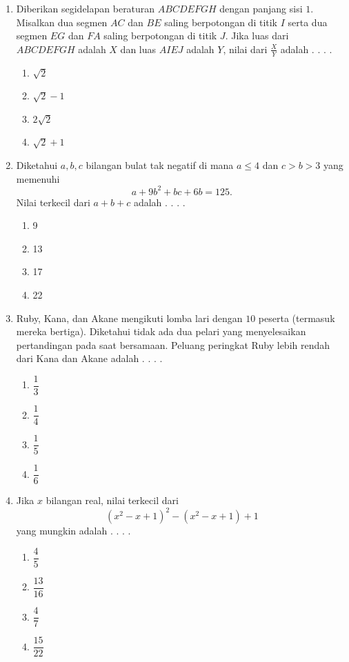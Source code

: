 \documentclass{article}
\begin{document}
\begin{enumerate}
    \item Diberikan segidelapan beraturan $ABCDEFGH$ dengan panjang sisi $1$. Misalkan dua segmen $AC$ dan $BE$ saling berpotongan di titik $I$ serta dua segmen $EG$ dan $FA$ saling berpotongan di titik $J$. Jika luas dari $ABCDEFGH$ adalah $X$ dan luas $AIEJ$ adalah $Y$, nilai dari $\frac{X}{Y}$ adalah . . . .
    \begin{enumerate}[label={(\Alph*)}]
        \item $\sqrt{2}$ \item $\sqrt{2}-1$ \item $2\sqrt{2}$ \item $\sqrt{2}+1$
    \end{enumerate}

    \item Diketahui $a,b,c$ bilangan bulat tak negatif di mana $a\le 4$ dan $c>b>3$ yang memenuhi
    $$a+9b^2  + bc+6b= 125.$$
    Nilai terkecil dari $a+b+c$ adalah . . . .
    \begin{enumerate}[label={(\Alph*)}]
        \item 9 \item 13 \item 17 \item 22
    \end{enumerate}

    \item Ruby, Kana, dan Akane mengikuti lomba lari dengan $10$ peserta (termasuk mereka bertiga). Diketahui tidak ada dua pelari yang menyelesaikan pertandingan pada saat bersamaan. Peluang peringkat Ruby lebih rendah dari Kana dan Akane adalah . . . .
    \begin{enumerate}[label={(\Alph*)}]
        \item $\dfrac{1}{3}$ \item $\dfrac{1}{4}$ \item $\dfrac{1}{5}$ \item $\dfrac{1}{6}$
    \end{enumerate}

    \item Jika $x$ bilangan real, nilai terkecil dari
    $$\left (x^2-x+1\right )^2 -\left (x^2-x+1\right )+1$$
    yang mungkin adalah . . . .
    \begin{enumerate}[label={(\Alph*)}]
        \item $\dfrac{4}{5}$ \item $\dfrac{13}{16}$ \item $\dfrac{4}{7}$ \item $\dfrac{15}{22}$
    \end{enumerate}


\end{enumerate}
\end{document}
